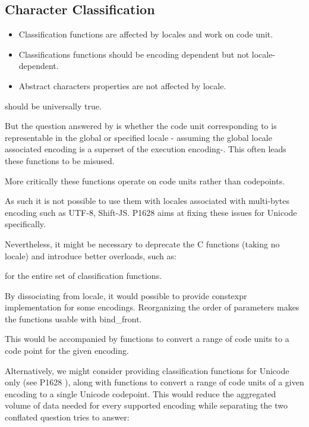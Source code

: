 \documentclass{wg21}
\newcommand{\UnicodeLetter}[1]{\textbf{\textcolor{BrickRed}{\Large\tcode{#1}}}}
\begin{document}
\subsection{Character Classification}
\begin{itemize}
    \item Classification functions are affected by locales and work on code unit.
    \item Classifications functions should be encoding dependent but not locale-dependent.
    \item Abstract characters properties are not affected by locale.
\end{itemize}

 should be universally true.

But the question answered by  is whether the code unit corresponding to \UnicodeLetter{a} is representable in the global or specified locale - assuming the global locale associated encoding is a superset of the execution encoding-.
This often leads these functions to be misused.

More critically these functions operate on code units rather than codepoints.

As such it is not possible to use them with locales associated with multi-bytes encoding such as UTF-8, Shift-JS.
P1628 aims at fixing these issues for Unicode specifically.

Nevertheless, it might be necessary to deprecate the C functions (taking no locale) and introduce better overloads, such as:


for the entire set of classification functions.

By dissociating from locale, it would possible to provide constexpr implementation for some encodings.
Reorganizing the order of parameters makes the functions usable with bind_front.

This would be accompanied by functions to convert a range of code units to a code point for the given encoding.

Alternatively, we might consider providing classification functions for Unicode only (see P1628 \cite{P1628R0}), along with functions to convert a range of code units of a given encoding to a single Unicode codepoint. This would reduce the aggregated volume of data needed for every supported encoding while separating the two conflated question  tries to answer:
\end{document}
